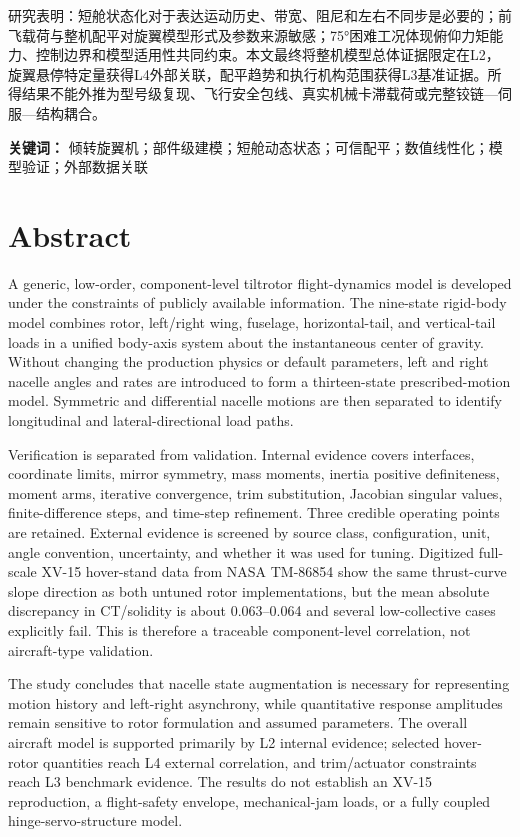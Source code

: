 \documentclass[UTF8,12pt,openany]{ctexbook}
\begin{document}
研究表明：短舱状态化对于表达运动历史、带宽、阻尼和左右不同步是必要的；前飞载荷与整机配平对旋翼模型形式及参数来源敏感；75°困难工况体现俯仰力矩能力、控制边界和模型适用性共同约束。本文最终将整机模型总体证据限定在L2，旋翼悬停特定量获得L4外部关联，配平趋势和执行机构范围获得L3基准证据。所得结果不能外推为型号级复现、飞行安全包线、真实机械卡滞载荷或完整铰链—伺服—结构耦合。

\textbf{关键词：} 倾转旋翼机；部件级建模；短舱动态状态；可信配平；数值线性化；模型验证；外部数据关联

\section{Abstract}

A generic, low-order, component-level tiltrotor flight-dynamics model is developed under the constraints of publicly available information. The nine-state rigid-body model combines rotor, left/right wing, fuselage, horizontal-tail, and vertical-tail loads in a unified body-axis system about the instantaneous center of gravity. Without changing the production physics or default parameters, left and right nacelle angles and rates are introduced to form a thirteen-state prescribed-motion model. Symmetric and differential nacelle motions are then separated to identify longitudinal and lateral-directional load paths.

Verification is separated from validation. Internal evidence covers interfaces, coordinate limits, mirror symmetry, mass moments, inertia positive definiteness, moment arms, iterative convergence, trim substitution, Jacobian singular values, finite-difference steps, and time-step refinement. Three credible operating points are retained. External evidence is screened by source class, configuration, unit, angle convention, uncertainty, and whether it was used for tuning. Digitized full-scale XV-15 hover-stand data from NASA TM-86854 show the same thrust-curve slope direction as both untuned rotor implementations, but the mean absolute discrepancy in CT/solidity is about 0.063–0.064 and several low-collective cases explicitly fail. This is therefore a traceable component-level correlation, not aircraft-type validation.

The study concludes that nacelle state augmentation is necessary for representing motion history and left-right asynchrony, while quantitative response amplitudes remain sensitive to rotor formulation and assumed parameters. The overall aircraft model is supported primarily by L2 internal evidence; selected hover-rotor quantities reach L4 external correlation, and trim/actuator constraints reach L3 benchmark evidence. The results do not establish an XV-15 reproduction, a flight-safety envelope, mechanical-jam loads, or a fully coupled hinge-servo-structure model.
\end{document}
